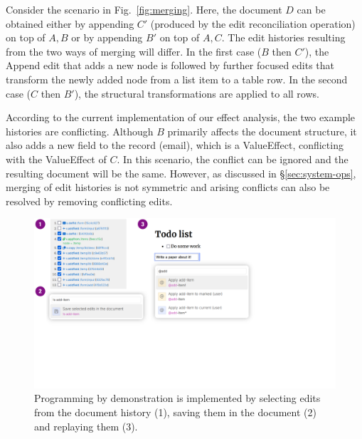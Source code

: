 \documentclass[sigconf,anonymous,screen]{acmart}
\newcommand{\ident}[1]{{\sffamily #1}}
\newcommand{\note}[1]{\textcolor{red}{#1}}
\begin{document}
Consider the scenario in Fig.~\ref{fig:merging}. Here, the document $D$ can be obtained
either by appending $C'$ (produced by the edit reconciliation operation) on top of $A,B$ or by
appending $B'$ on top of $A,C$. The edit histories resulting from the two ways of merging will
differ. In the first case ($B$ then $C'$), the \ident{Append} edit that adds a new node is followed
by further focused edits that transform the newly added node from a list item to a table row.
In the second case ($C$ then $B'$), the structural transformations are applied to all rows.

According to the current implementation of our effect analysis, the two example histories are conflicting.
Although $B$ primarily affects the document structure, it also adds a new field to the record (email),
which is a \ident{ValueEffect}, conflicting with the \ident{ValueEffect} of $C$. In this scenario, the
conflict can be ignored and the resulting document will be the same.  However, as discussed
in \S\ref{sec:system-ops}, merging of edit histories is not symmetric and arising conflicts
can also be resolved by removing conflicting edits.



\begin{figure}[t]
\includegraphics[width=0.9\columnwidth,clip,trim=0cm 7cm 9cm 0cm]{fig/pbd.pdf}
\caption{Programming by demonstration is implemented by selecting edits from the document
history (1), saving them in the document (2) and replaying them (3).}
\label{fig:pbd}
\end{figure}
\end{document}
